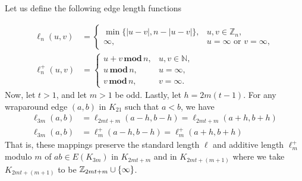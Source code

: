 \begin{thm}\label{thm:genwrapmap}
Let us define the following edge length functions

\begin{align*}
    \ell_{n}(u,v)&=
      \begin{cases}
        \min\{|u-v|,n-|u-v|\}, & u,v\in \mathbb{Z}_{n},\\
        \infty, & u=\infty\text{ or }v=\infty,
      \end{cases}\\
    \ell_{n}^{+}(u,v)&=
      \begin{cases}
        u+v\mathbf{\,mod\,}n, & u,v\in \mathbb{N},\\
        u\mathbf{\,mod\,}n,   & u=\infty,\\
        v\mathbf{\,mod\,}n,   & v=\infty.
      \end{cases}
    \end{align*}
\noindent Now, let $t>1$, and let $m>1$ be odd. Lastly, let $h =2m(t-1)$. For any wraparound edge $(a,b)$ in $K_{21}$ such that $a<b$, we have
\begin{align}
  \ell_{3m}(a,b)
    &=\ell_{2mt+m}(a-h,b-h)
     =\ell_{2mt+m}(a+h,b+h)
  \tag{short}\label{eq:short}\\
  \ell_{3m}(a,b)
    &=\ell_{m}^{+}(a-h,b-h)
     =\ell_{m}^{+}(a+h,b+h)
  \tag{wraparound}\label{eq:wraparound}
\end{align}
That is, these mappings preserve the standard length $\ell$ and additive length $\ell_{m}^{+}$ modulo $m$ of $ab\in E(K_{3m})$ in $K_{2mt+m}$ and in $K_{2mt+(m+1)}$ where we take $K_{2mt+(m+1)}$ to be $\mathbb{Z}_{2mt+m}\cup \{\infty\}$.
\end{thm}

